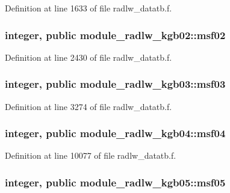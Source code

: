 Definition at line 1633 of file radlw\+\_\+datatb.\+f.

\subsubsection[{\texorpdfstring{msf02}{msf02}}]{\setlength{\rightskip}{0pt plus 5cm}integer, public module\+\_\+radlw\+\_\+kgb02\+::msf02}\hypertarget{group__module__radlw__main_ga99b728d38d664afc203303563541ab5c}{}\label{group__module__radlw__main_ga99b728d38d664afc203303563541ab5c}


Definition at line 2430 of file radlw\+\_\+datatb.\+f.

\subsubsection[{\texorpdfstring{msf03}{msf03}}]{\setlength{\rightskip}{0pt plus 5cm}integer, public module\+\_\+radlw\+\_\+kgb03\+::msf03}\hypertarget{group__module__radlw__main_gaf553bb46aa3ea6bcbb945cb2c2778955}{}\label{group__module__radlw__main_gaf553bb46aa3ea6bcbb945cb2c2778955}


Definition at line 3274 of file radlw\+\_\+datatb.\+f.

\subsubsection[{\texorpdfstring{msf04}{msf04}}]{\setlength{\rightskip}{0pt plus 5cm}integer, public module\+\_\+radlw\+\_\+kgb04\+::msf04}\hypertarget{group__module__radlw__main_ga4b38dd1165aca80e19697df7ae74a27a}{}\label{group__module__radlw__main_ga4b38dd1165aca80e19697df7ae74a27a}


Definition at line 10077 of file radlw\+\_\+datatb.\+f.

\subsubsection[{\texorpdfstring{msf05}{msf05}}]{\setlength{\rightskip}{0pt plus 5cm}integer, public module\+\_\+radlw\+\_\+kgb05\+::msf05}\hypertarget{group__module__radlw__main_ga1c9a43b7011e7328fa62d3ecd29acc73}{}\label{group__module__radlw__main_ga1c9a43b7011e7328fa62d3ecd29acc73}


